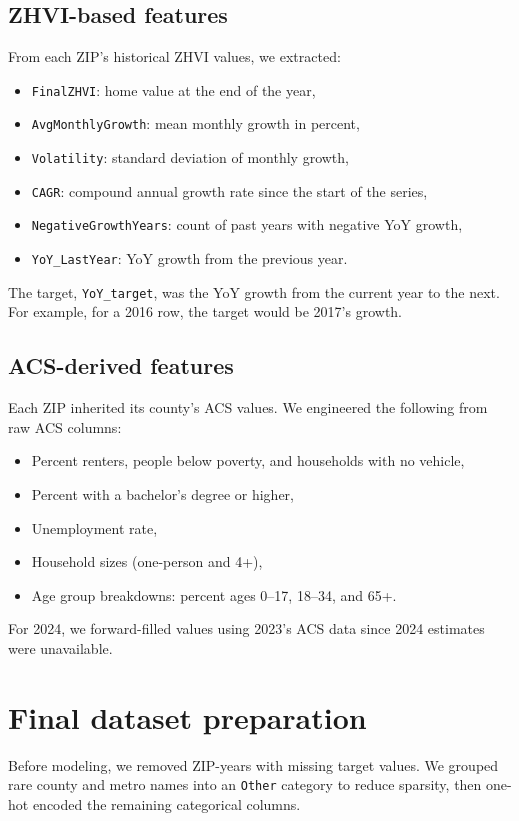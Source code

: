 \subsection{ZHVI-based features}
From each ZIP’s historical ZHVI values, we extracted:
\begin{itemize}
    \item \texttt{FinalZHVI}: home value at the end of the year,
    \item \texttt{AvgMonthlyGrowth}: mean monthly growth in percent,
    \item \texttt{Volatility}: standard deviation of monthly growth,
    \item \texttt{CAGR}: compound annual growth rate since the start of the series,
    \item \texttt{NegativeGrowthYears}: count of past years with negative YoY growth,
    \item \texttt{YoY\_LastYear}: YoY growth from the previous year.
\end{itemize}

The target, \texttt{YoY\_target}, was the YoY growth from the current year to the next. For example, for a 2016 row, the target would be 2017’s growth.

\subsection{ACS-derived features}
Each ZIP inherited its county's ACS values. We engineered the following from raw ACS columns:
\begin{itemize}
    \item Percent renters, people below poverty, and households with no vehicle,
    \item Percent with a bachelor’s degree or higher,
    \item Unemployment rate,
    \item Household sizes (one-person and 4+),
    \item Age group breakdowns: percent ages 0–17, 18–34, and 65+.
\end{itemize}

For 2024, we forward-filled values using 2023’s ACS data since 2024 estimates were unavailable.

\section{Final dataset preparation}
Before modeling, we removed ZIP-years with missing target values. We grouped rare county and metro names into an \texttt{Other} category to reduce sparsity, then one-hot encoded the remaining categorical columns.

